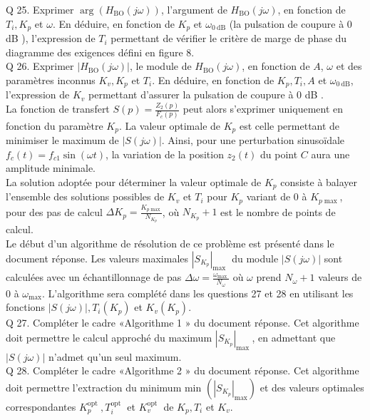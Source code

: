 \documentclass[10pt]{article}
\begin{document}
Q 25. Exprimer $\arg \left(H_{\mathrm{BO}}(j \omega)\right)$, l'argument de $H_{\mathrm{BO}}(j \omega)$, en fonction de $T_{i}, K_{p}$ et $\omega$. En déduire, en fonction de $K_{p}$ et $\omega_{0 \mathrm{~dB}}$ (la pulsation de coupure à 0 dB ), l'expression de $T_{i}$ permettant de vérifier le critère de marge de phase du diagramme des exigences défini en figure 8.\\
Q 26. Exprimer $\left|H_{\mathrm{BO}}(j \omega)\right|$, le module de $H_{\mathrm{BO}}(j \omega)$, en fonction de $A$, $\omega$ et des paramètres inconnus $K_{v}, K_{p}$ et $T_{i}$. En déduire, en fonction de $K_{p}, T_{i}, A$ et $\omega_{0 \mathrm{~dB}}$, l'expression de $K_{v}$ permettant d'assurer la pulsation de coupure à 0 dB .\\
La fonction de transfert $S(p)=\frac{Z_{2}(p)}{F_{c}(p)}$ peut alors s'exprimer uniquement en fonction du paramètre $K_{p}$. La valeur optimale de $K_{p}$ est celle permettant de minimiser le maximum de $|S(j \omega)|$. Ainsi, pour une perturbation sinusoïdale $f_{c}(t)=f_{c 1} \sin (\omega t)$, la variation de la position $z_{2}(t)$ du point $C$ aura une amplitude minimale.\\
La solution adoptée pour déterminer la valeur optimale de $K_{p}$ consiste à balayer l'ensemble des solutions possibles de $K_{v}$ et $T_{i}$ pour $K_{p}$ variant de 0 à $K_{p \max }$, pour des pas de calcul $\Delta K_{p}=\frac{K_{p \max }}{N_{K_{p}}}$, où $N_{K_{p}}+1$ est le nombre de points de calcul.\\
Le début d'un algorithme de résolution de ce problème est présenté dans le document réponse. Les valeurs maximales $\left|S_{K_{p}}\right|_{\text {max }}$ du module $|S(j \omega)|$ sont calculées avec un échantillonnage de pas $\Delta \omega=\frac{\omega_{\text {max }}}{N_{\omega}}$ où $\omega$ prend $N_{\omega}+1$ valeurs de 0 à $\omega_{\max }$. L'algorithme sera complété dans les questions 27 et 28 en utilisant les fonctions $|S(j \omega)|, T_{i}\left(K_{p}\right)$ et $K_{v}\left(K_{p}\right)$.\\
Q 27. Compléter le cadre «Algorithme 1 » du document réponse. Cet algorithme doit permettre le calcul approché du maximum $\left|S_{K_{p}}\right|_{\text {max }}$, en admettant que $|S(j \omega)|$ n'admet qu'un seul maximum.\\
Q 28. Compléter le cadre «Algorithme 2 » du document réponse. Cet algorithme doit permettre l'extraction du minimum min $\left(\left|S_{K_{p}}\right|_{\max }\right)$ et des valeurs optimales correspondantes $K_{p}^{\text {opt }}, T_{i}^{\text {opt }}$ et $K_{v}^{\text {opt }}$ de $K_{p}, T_{i}$ et $K_{v}$.
\end{document}
